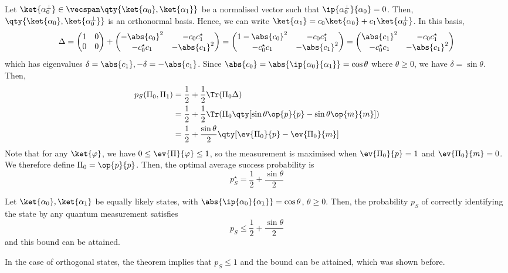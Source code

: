 Let $\ket{\alpha_0^\perp} \in \vecspan\qty{\ket{\alpha_0}, \ket{\alpha_1}}$ be a normalised vector such that $\ip{\alpha_0^\perp}{\alpha_0} = 0$.
Then, $\qty{\ket{\alpha_0}, \ket{\alpha_0^\perp}}$ is an orthonormal basis.
Hence, we can write $\ket{\alpha_1} = c_0 \ket{\alpha_0} + c_1 \ket{\alpha_0^\perp}$.
In this basis,
\[ \Delta = \begin{pmatrix}
    1 & 0 \\
    0 & 0
\end{pmatrix} + \begin{pmatrix}
    -\abs{c_0}^2 & -c_0 c_1^\star \\
    -c_0^\star c_1 & -\abs{c_1}^2
\end{pmatrix} = \begin{pmatrix}
    1 - \abs{c_0}^2 & -c_0 c_1^\star \\
    -c_0^\star c_1 & -\abs{c_1}^2
\end{pmatrix} = \begin{pmatrix}
    \abs{c_1}^2 & -c_0 c_1^\star \\
    -c_0^\star c_1 & -\abs{c_1}^2
\end{pmatrix} \]
which has eigenvalues $\delta = \abs{c_1}, -\delta = -\abs{c_1}$.
Since $\abs{c_0} = \abs{\ip{\alpha_0}{\alpha_1}} = \cos \theta$ where $\theta \geq 0$, we have $\delta = \sin \theta$.
Then,
\begin{align*}
    p_S(\Pi_0, \Pi_1) &= \frac{1}{2} + \frac{1}{2} \Tr(\Pi_0 \Delta) \\
    &= \frac{1}{2} + \frac{1}{2} \Tr(\Pi_0 \qty[\sin\theta \op{p}{p} - \sin\theta \op{m}{m}]) \\
    &= \frac{1}{2} + \frac{\sin\theta}{2} \qty[\ev{\Pi_0}{p} - \ev{\Pi_0}{m}]
\end{align*}
Note that for any $\ket{\varphi}$, we have $0 \leq \ev{\Pi}{\varphi} \leq 1$, so the measurement is maximised when $\ev{\Pi_0}{p} = 1$ and $\ev{\Pi_0}{m} = 0$.
We therefore define $\Pi_0 = \op{p}{p}$.
Then, the optimal average success probability is
\[ p_S^\star = \frac{1}{2} + \frac{\sin\theta}{2} \]
\begin{theorem}
    Let $\ket{\alpha_0}, \ket{\alpha_1}$ be equally likely states, with $\abs{\ip{\alpha_0}{\alpha_1}} = \cos\theta$, $\theta \geq 0$.
    Then, the probability $p_S$ of correctly identifying the state by any quantum measurement satisfies
    \[ p_S \leq \frac{1}{2} + \frac{\sin\theta}{2} \]
    and this bound can be attained.
\end{theorem}
In the case of orthogonal states, the theorem implies that $p_S \leq 1$ and the bound can be attained, which was shown before.

